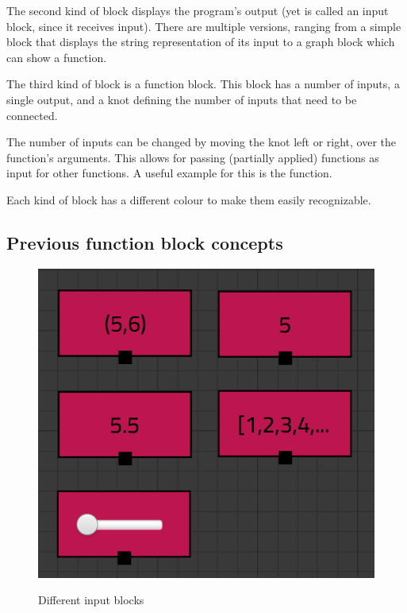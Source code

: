The second kind of block displays the program's output (yet is called an input block, since it receives input).  
There are multiple versions, ranging from a simple block that displays the string representation of its input to a graph block which can show a function. 

The third kind of block is a function block. This block has a number of inputs, a single output, and a knot defining the number of inputs that need to be connected. 

The number of inputs can be changed by moving the knot left or right, over the function's arguments.
This allows for passing (partially applied) functions as input for other functions. 
A useful example for this is the  function.

Each kind of block has a different colour to make them easily recognizable.

\subsection{Previous function block concepts}

\begin{figure}[p]
	\centering
	\includegraphics[scale=0.5]{Images/blocks-inputs}
	\label{fig:blocks-inputs}
	\caption{Different input blocks}
\end{figure}

